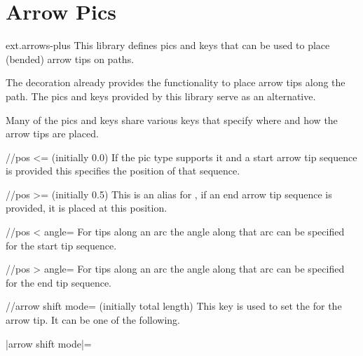 %
%
%

\section{Arrow Pics}
\label{tikzlibrary:arrows}
\tikzset{external/export/.try=false}%
\begin{tikzlibrary}{ext.arrows-plus}
  This library defines pics and keys
  that can be used to place (bended) arrow tips on paths.
\end{tikzlibrary}

\begin{multicols}{2}
The  decoration
already provides the functionality to place arrow tips along the path.
The pics and keys provided by this library serve as an alternative.

Many of the pics and keys share various keys that specify
where and how the arrow tips are placed.
\begin{key}{/\tikzext/pos <= (initially 0.0)}
If the pic type supports it and a start arrow tip sequence is provided
this specifies the position of that sequence.
\end{key}
\begin{key}{/\tikzext/pos >= (initially 0.5)}
This is an alias for ,
if an end arrow tip sequence is provided, it is placed at this position.
\end{key}
\begin{key}{/\tikzext/pos < angle=}
For tips along an arc the angle along that arc can be specified for the start tip sequence.
\end{key}
\begin{key}{/\tikzext/pos > angle=}
For tips along an arc the angle along that arc can be specified for the end tip sequence.
\end{key}
\begin{key}{/\tikzext/arrow shift mode= (initially total length)}
This key is used to set the  for the arrow tip.
It can be one of the following.
\begin{description}
\item[|arrow shift mode|=]


\end{description}
\end{key}
\end{multicols}
